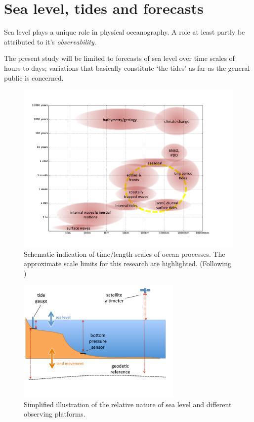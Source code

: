 \section{Sea level, tides and forecasts}

Sea level plays a unique role in physical oceanography. A role at least partly be attributed to it's \emph{observability}\citep{Wilson:2010hy}.


The present study will be limited to forecasts of sea level over time scales of hours to days; variations that basically constitute `the tides' as far as the general public is concerned.

\begin{figure}[h]\centering
  \includegraphics[width=130mm]{figures/diagrams/ocean_scales.png}
  \caption{Schematic indication of time/length scales of ocean processes.  The approximate scale limits for this research are highlighted. (Following \citet{Chelton:2001ws} )}
  \label{fig:SCALES}
\end{figure}

\begin{figure}[h]\centering
  \includegraphics[width=80mm]{figures/diagrams/sealevel_cartoon.pdf}
  \caption{Simplified illustration of the relative nature of sea level and different observing platforms.}
  \label{fig:SEALEVEL}
\end{figure}


